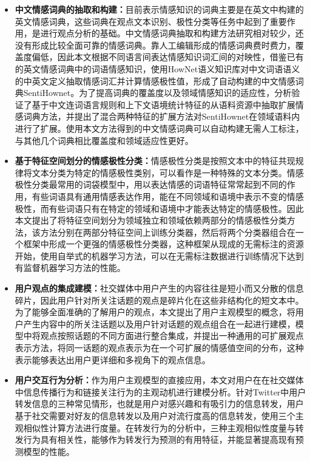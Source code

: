 \begin{cabstract}
\begin{itemize}
\item \textbf{中文情感词典的抽取和构建：}目前表示情感知识的词典主要是在英文中构建的英文情感词典，这些词典在观点文本识别、极性分类等任务中起到了重要作用，是进行观点分析的基础。中文情感词典抽取和构建方法研究相对较少，还没有形成比较全面可靠的情感词典。靠人工编辑形成的情感词典费时费力，覆盖度偏低，因此本文根据不同语言间表达情感知识词汇间的对映性，借鉴已有的英文情感词典中的词语情感知识，使用HowNet语义知识库对中文词语语义的中英文定义抽取情感词汇并计算情感极性值，形成了自动构建的中文情感词典SentiHownet。为了提高词典的覆盖度以及领域情感知识的适应性，分析验证了基于中文连词语言规则和上下文语境统计特征的从语料资源中抽取扩展情感词典方法，并提出了混合两种特征的扩展方法对SentiHownet在领域语料内进行了扩展。使用本文方法得到的中文情感词典可以自动构建无需人工标注，与其他几个词典相比覆盖度和领域适应性更好。
\item \textbf{基于特征空间划分的情感极性分类：}情感极性分类是按照文本中的特征共现规律将文本分类为特定的情感极性类别，可以看作是一种特殊的文本分类。情感极性分类最常用的词袋模型中，用以表达情感的词语特征常常起到不同的作用，有些词语具有通用情感表达作用，能在不同领域和语境中表示不变的情感极性，而有些词语只有在特定的领域和语境中才能表达特定的情感极性。因此本文提出了将特征空间划分为领域独立和领域依赖两部分的情感极性分类方法，该方法分别在两部分特征空间上训练分类器，然后将两个分类器组合在一个框架中形成一个更强的情感极性分类器，这种框架从现成的无需标注的资源开始，使用自举式的机器学习方法，可以在无需标注数据进行训练情况下达到有监督机器学习方法的性能。
\item \textbf{用户观点的集成建模：}社交媒体中用户产生的内容往往是短小而又分散的信息碎片，因此用户针对所关注话题的观点是碎片化在这些非结构化的短文本中。为了能够全面准确的了解用户的观点，本文提出了用户主观模型的概念，将用户产生内容中的所关注话题以及用户针对话题的观点组合在一起进行建模，模型中将观点按照话题的不同方面进行整合集成，并提出一种通用的可扩展观点表示方法，将同一话题的观点表示为在一个可扩展的情感值空间的分布，这种表示能够表达出用户更详细和多视角下的观点信息。
\item \textbf{用户交互行为分析：}作为用户主观模型的直接应用，本文对用户在在社交媒体中信息传播行为和链接关注行为的主观动机进行建模分析。针对Twitter中用户转发信息的三种常见情形，也就是用户对感兴趣和有吸引力的信息转发，用户基于社交需要对好友的信息转发以及用户对流行度高的信息转发，使用三个主观相似性计算方法进行度量。在转发行为的分析中，三种主观相似性度量与转发行为具有相关性，能够作为转发行为预测的有用特征，并能显著提高现有预测模型的性能。
\end{itemize}


\end{cabstract}
